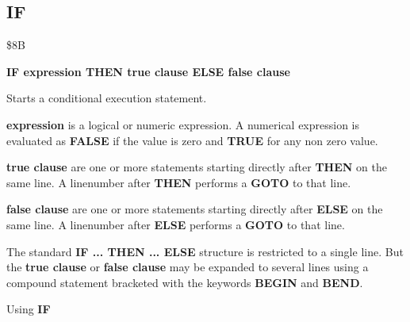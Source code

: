 
\newpage
\subsection{IF}
\begin{description}[leftmargin=3cm,style=nextline]
\item [Token:] \$8B
\item [Format:] {\bf IF expression THEN true clause ELSE false clause}
\item [Usage:] Starts a conditional execution
               statement.

               {\bf expression} is a logical or numeric expression.
               A numerical expression is evaluated as {\bf FALSE}
               if the value is zero and {\bf TRUE} for any non zero
               value.

               {\bf true clause} are one or more statements starting
               directly after {\bf THEN} on the same line.
               A linenumber after {\bf THEN} performs a
               {\bf GOTO} to that line.

               {\bf false clause} are one or more statements starting
               directly after {\bf ELSE} on the same line.
               A linenumber after {\bf ELSE} performs a
               {\bf GOTO} to that line.

\item [Remarks:]
               The standard {\bf IF ... THEN ... ELSE} structure
               is restricted to a single line. But the {\bf true clause}
               or {\bf false clause} may be expanded to several lines
               using a compound statement bracketed with the keywords
               {\bf BEGIN} and {\bf BEND}.
\item [Example:]
                Using {\bf IF}
\end{description}


\newpage

